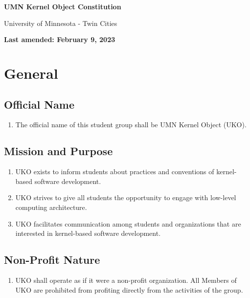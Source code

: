 \documentclass[12pt,executivepaper]{article}
\begin{document}
\begin{center}
    \Large
    \textbf{UMN Kernel Object Constitution}

    \smallskip

    \large
    University of Minnesota - Twin Cities

    \smallskip

    \normalsize
    \textbf{Last amended: February 9, 2023}
\end{center}

\section{General}

\subsection{Official Name}
\begin{enumerate}
    \item The official name of this student group shall be UMN Kernel Object (UKO).
\end{enumerate}

\subsection{Mission and Purpose}
\begin{enumerate}
    \item UKO exists to inform students about practices and conventions of kernel-based
          software development.
    \item UKO strives to give all students the opportunity to engage with low-level computing
          architecture.
    \item UKO facilitates communication among students and organizations that are interested
          in kernel-based software development.
\end{enumerate}

\subsection{Non-Profit Nature}
\begin{enumerate}
    \item UKO shall operate as if it were a non-profit organization. All Members
          of UKO are prohibited from profiting directly from the activities of
          the group.
\end{enumerate}
\end{document}
